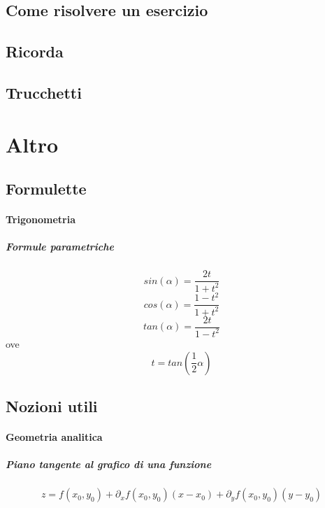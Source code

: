 \documentclass[a4paper,10pt]{book}
\begin{document}
\subsection{Come risolvere un esercizio}

\subsection{Ricorda}
\subsection{Trucchetti}

\section{Altro}
\subsection{Formulette}
\paragraph{Trigonometria}
\subparagraph{Formule parametriche}
$$sin(\alpha) = \frac{2t}{1+t^2}$$
$$cos(\alpha) = \frac{1-t^2}{1+t^2}$$
$$tan(\alpha) = \frac{2t}{1-t^2}$$
ove $$t = tan(\frac{1}{2}\alpha)$$
\subsection{Nozioni utili}
\paragraph{Geometria analitica}
\subparagraph{Piano tangente al grafico di una funzione}
$$z = f(x_0, y_0) + \partial_x f(x_0, y_0) (x-x_0) + \partial_y f(x_0, y_0) (y - y_0) $$
\end{document}
